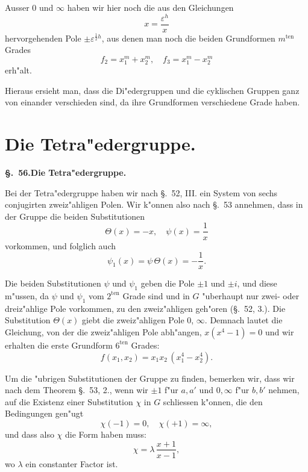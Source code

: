 \documentclass[12pt,a4paper]{article}
\theoremstyle{definition}
\begin{document}
Ausser $0$ und $\infty$ haben wir hier noch die aus den Gleichungen
\[
x = \frac{\varepsilon^h}{x}
\]
hervorgehenden Pole $\pm\varepsilon^{\frac{1}{2}h}$, aus denen man noch die beiden Grundformen $m^{\text{ten}}$ Grades
\begin{equation}\label{eq:55-7}
f_2 = x_1^m + x_2^m, \quad f_3 = x_1^m - x_2^m
\end{equation}
erh"alt.

Hieraus ersieht man, dass die Di"edergruppen und die cyklischen Gruppen ganz von einander verschieden sind, da ihre Grundformen verschiedene Grade haben.


\section{Die Tetra"edergruppe.}\label{sec:56}

\noindent\textbf{\S.~56.}\quad\textbf{Die Tetra"edergruppe.}
\vspace{0.3cm}

Bei der Tetra"edergruppe haben wir nach \S.~52, III. ein System von sechs conjugirten zweiz"ahligen Polen. Wir k"onnen also nach \S.~53 annehmen, dass in der Gruppe die beiden Substitutionen
\[
\Theta(x) = -x, \quad \psi(x) = \frac{1}{x}
\]
vorkommen, und folglich auch
\[
\psi_1(x) = \psi\,\Theta(x) = -\frac{1}{x}.
\]

Die beiden Substitutionen $\psi$ und $\psi_1$ geben die Pole $\pm 1$ und $\pm i$, und diese m"ussen, da $\psi$ und $\psi_1$ vom $2^{\text{ten}}$ Grade sind und in $G$ "uberhaupt nur zwei- oder dreiz"ahlige Pole vorkommen, zu den zweiz"ahligen geh"oren (\S.~52, 3.). Die Substitution $\Theta(x)$ giebt die zweiz"ahligen Pole $0$, $\infty$. Demnach lautet die Gleichung, von der die zweiz"ahligen Pole abh"angen, $x(x^4 - 1) = 0$ und wir erhalten die erste Grundform $6^{\text{ten}}$ Grades:
\begin{equation}\label{eq:56-1}
f(x_1, x_2) = x_1 x_2\,(x_1^4 - x_2^4).
\end{equation}


Um die "ubrigen Substitutionen der Gruppe zu finden, bemerken wir, dass wir nach dem Theorem \S.~53, 2., wenn wir $\pm 1$ f"ur $a, a'$ und $0, \infty$ f"ur $b, b'$ nehmen, auf die Existenz einer Substitution $\chi$ in $G$ schliessen k"onnen, die den Bedingungen gen"ugt
\[
\chi(-1) = 0, \quad \chi(+1) = \infty,
\]
und dass also $\chi$ die Form haben muss:
\begin{equation}\label{eq:56-2}
\chi = \lambda\,\frac{x + 1}{x - 1},
\end{equation}
wo $\lambda$ ein constanter Factor ist.
\end{document}
